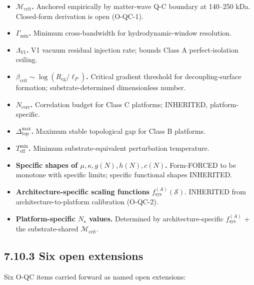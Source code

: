 \documentclass[11pt]{book}
\begin{document}
\begin{itemize}
\item \textbf{$\mathcal{M}_\mathrm{crit}$.} Anchored empirically by matter-wave Q-C boundary at 140–250 kDa. Closed-form derivation is open (O-QC-1).
\item \textbf{$\Gamma_\mathrm{min}$.} Minimum cross-bandwidth for hydrodynamic-window resolution.
\item \textbf{$\Lambda_{V1}$.} V1 vacuum residual injection rate; bounds Class A perfect-isolation ceiling.
\item \textbf{$\beta_\mathrm{crit} \sim \log(R_\mathrm{cg}/\ell_P)$.} Critical gradient threshold for decoupling-surface formation; substrate-determined dimensionless number.
\item \textbf{$N_\mathrm{corr}$.} Correlation budget for Class C platforms; INHERITED, platform-specific.
\item \textbf{$\Delta_\mathrm{top}^{\max}$.} Maximum stable topological gap for Class B platforms.
\item \textbf{$T_\mathrm{eff}^{\min}$.} Minimum substrate-equivalent perturbation temperature.
\item \textbf{Specific shapes of $\mu, \kappa, g(N), h(N), c(N)$.} Form-FORCED to be monotone with specific limits; specific functional shapes INHERITED.
\item \textbf{Architecture-specific scaling functions} $f_\mathrm{sys}^{(A)}(\mathcal{S})$. INHERITED from architecture-to-platform calibration (O-QC-2).
\item \textbf{Platform-specific $N_\star$ values.} Determined by architecture-specific $f_\mathrm{sys}^{(A)}$ + the substrate-shared $\mathcal{M}_\mathrm{crit}$.
\end{itemize}

\subsection{7.10.3 Six open extensions}

Six O-QC items carried forward as named open extensions:
\end{document}
